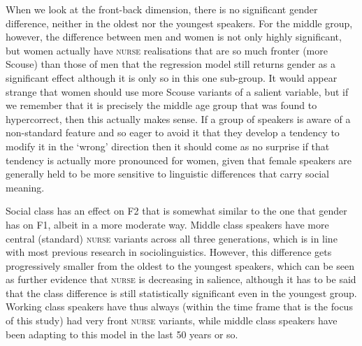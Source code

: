 When we look at the front-back dimension, there is no significant gender difference, neither in the oldest nor the youngest speakers.
For the middle group, however, the difference between men and women is not only highly significant, but women actually have \textsc{nurse} realisations that are so much fronter (more Scouse) than those of men that the regression model still returns gender as a significant effect although it is only so in this one sub-group.
It would appear strange that women should use more Scouse variants of a salient variable, but if we remember that it is precisely the middle age group that was found to hypercorrect, then this actually makes sense.
If a group of speakers is aware of a non-standard feature and so eager to avoid it that they develop a tendency to modify it in the `wrong' direction then it should come as no surprise if that tendency is actually more pronounced for women, given that female speakers are generally held to be more sensitive to linguistic differences that carry social meaning.

Social class has an effect on F2 that is somewhat similar to the one that gender has on F1, albeit in a more moderate way.
Middle class speakers have more central (standard) \textsc{nurse} variants across all three generations, which is in line with most previous research in sociolinguistics.
However, this difference gets progressively smaller from the oldest to the youngest speakers, which can be seen as further evidence that \textsc{nurse} is decreasing in salience, although it has to be said that the class difference is still statistically significant even in the youngest group.
Working class speakers have thus always (within the time frame that is the focus of this study) had very front \textsc{nurse} variants, while middle class speakers have been adapting to this model in the last 50 years or so.

